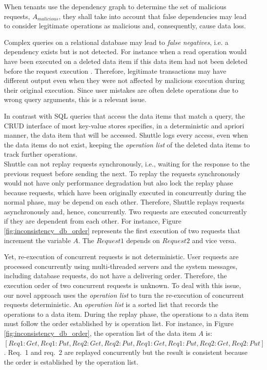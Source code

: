 When tenants use the dependency graph to determine the set of malicious requests, $A_{malicious}$, they shall take into account that false dependencies may lead to consider legitimate operations as malicious and, consequently, cause data loss.

Complex queries on a relational database may lead to \emph{false negatives}, i.e. a dependency exists but is not detected. For instance when a read operation would have been executed on a deleted data item if this data item had not been deleted before the request execution \cite{Xie2008}. Therefore, legitimate transactions may have different output even when they were not affected by malicious execution during their original execution. Since user mistakes are often delete operations due to wrong query arguments, this is a relevant issue. 

In contrast with SQL queries that access the data items that match a query, the \ac{CRUD} interface of most key-value stores specifies, in a deterministic and apriori manner, the data item that will be accessed. Shuttle logs every access, even when the data items do not exist, keeping the \emph{operation list} of the deleted data items to track further operations.\\


Shuttle can not replay requests synchronously, i.e., waiting for the response to the previous request before sending the next. To replay the requests synchronously would not have only performance degradation but also lock the replay phase because requests, which have been originally executed in concurrently during the normal phase, may be depend on each other. Therefore, Shuttle replays requests asynchronously and, hence, concurrently. Two requests are executed concurrently if they are dependent from each other. For instance, Figure \ref{fig:inconsistency_db_order} represents the first execution of two requests that increment the variable $A$. The $Request 1$ depends on $Request 2$ and vice versa. 

Yet, re-execution of concurrent requests is not deterministic. User requests are processed concurrently using multi-threaded servers and the system messages, including database requests, do not have a delivering order. Therefore, the execution order of two concurrent requests is unknown. To deal with this issue, our novel approach uses the \emph{operation list} to turn the re-execution of concurrent requests deterministic. An \emph{operation list} is a sorted list that records the operations to a data item. During the replay phase, the operations to a data item must follow the order established by is operation list. For instance, in Figure \ref{fig:inconsistency_db_order}, the operation list of the data item $A$ is: $[Req1:Get, Req1:Put, Req2:Get, Req2:Put, Req1:Get, Req1:Put, Req2:Get, Req2:Put]$. {Req.~1} and {req.~2} are replayed concurrently but the result is consistent because the order is established by the operation list.

